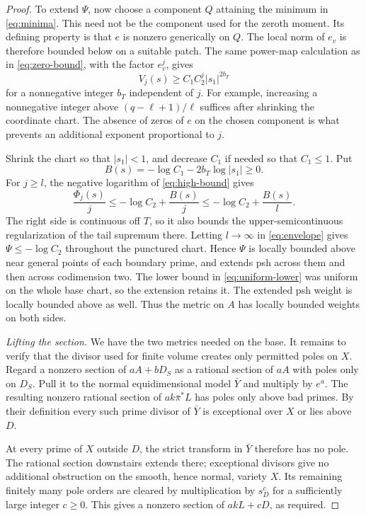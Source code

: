 \begin{proof}
To extend \(\Psi\), now choose a component \(Q\) attaining the
minimum in \eqref{eq:minima}. This need not be the component used
for the zeroth moment. Its defining property is that \(e\) is nonzero
generically on \(Q\). The local norm of \(e_v\) is therefore bounded
below on a suitable patch. The same power-map calculation as in
\eqref{eq:zero-bound}, with the factor \(e_v^j\), gives
\begin{equation}\label{eq:high-bound}
 V_j(s)\ge C_1C_2^j|s_1|^{2b_T}
\end{equation}
for a nonnegative integer \(b_T\) independent of \(j\).
For example, increasing a nonnegative integer above
\((q-\ell+1)/\ell\) suffices after shrinking the coordinate chart.
The absence of zeros of \(e\) on the chosen component is what prevents
an additional exponent proportional to \(j\).

Shrink the chart so that \(|s_1|<1\), and decrease \(C_1\) if needed
so that \(C_1\le1\). Put
\[
 B(s)=-\log C_1-2b_T\log|s_1|\ge0.
\]
For \(j\ge l\), the negative logarithm of \eqref{eq:high-bound} gives
\[
 \frac{\Phi_j(s)}{j}\le-\log C_2+\frac{B(s)}{j}
                  \le-\log C_2+\frac{B(s)}{l}.
\]
The right side is continuous off \(T\), so it also bounds the
upper-semicontinuous regularization of the tail supremum there.
Letting \(l\to\infty\) in \eqref{eq:envelope} gives
\(\Psi\le-\log C_2\) throughout the punctured chart.
Hence \(\Psi\) is locally bounded above near general points of
each boundary prime, and extends psh across them and then across
codimension two. The lower bound in \eqref{eq:uniform-lower} was
uniform on the whole base chart, so the extension retains it.
The extended psh weight is locally bounded above as well.
Thus the metric on \(A\) has locally bounded weights on both sides.

\medskip\noindent
\emph{Lifting the section.}
We have the two metrics needed on the base. It remains to verify
that the divisor used for finite volume creates only permitted poles
on \(X\). Regard a nonzero section of \(aA+bD_S\) as a rational section
of \(aA\) with poles only on \(D_S\). Pull it to the normal
equidimensional model \(\bar Y\) and multiply by \(e^a\).
The resulting nonzero rational section of \(ak\bar\pi^*L\) has poles
only above bad primes. By their definition every such prime divisor
of \(\bar Y\) is exceptional over \(X\) or lies above \(D\).

At every prime of \(X\) outside \(D\), the strict transform in
\(\bar Y\) therefore has no pole. The rational section downstairs
extends there; exceptional divisors give no additional obstruction
on the smooth, hence normal, variety \(X\).
Its remaining finitely many pole orders are cleared by multiplication
by \(s_D^c\) for a sufficiently large integer \(c\ge0\).
This gives a nonzero section of \(akL+cD\), as required.
\end{proof}
